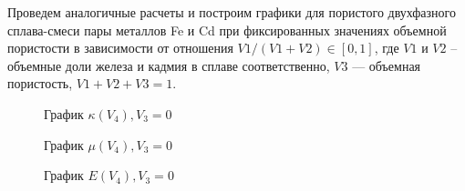 \documentclass[12pt,a4paper]{article}
\begin{document}
 Проведем аналогичные расчеты и построим графики для пористого двухфазного сплава-смеси пары металлов Fe и Cd при фиксированных значениях объемной пористости в зависимости от отношения $V1/(V1 + V2) \in [0, 1]$, где $V1$ и $V2$ -- объемные доли железа и кадмия в сплаве соответственно, $V3$ — объемная пористость, $V1 + V2 + V3 = 1$.

    \begin{figure}[h]
        \caption{График $\kappa(V_4), V_3 = 0$}
    \end{figure}

    \pagebreak

    \begin{figure}[h]
        \caption{График $\mu(V_4), V_3 = 0$}
    \end{figure}

    \begin{figure}[h]
        \caption{График $E(V_4), V_3 = 0$}
    \end{figure}
\end{document}
